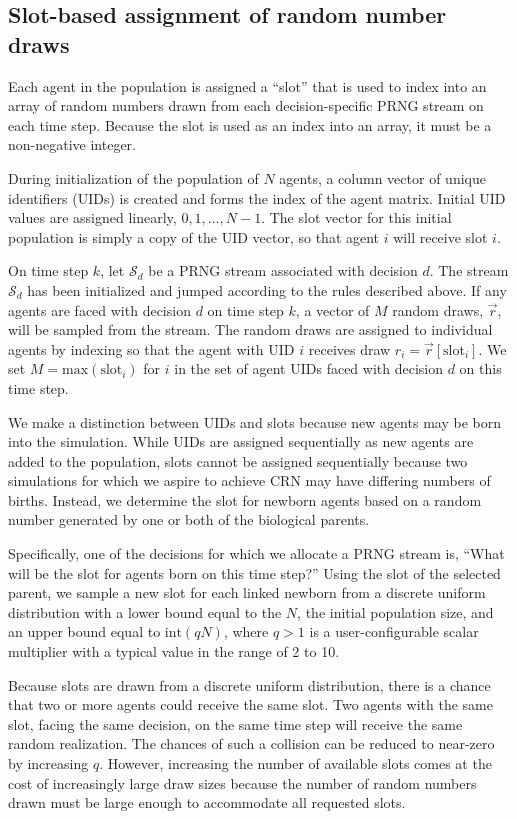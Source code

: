 \documentclass[10pt,letterpaper]{article}
\begin{document}
\subsection*{Slot-based assignment of random number draws}\label{s:slots}

Each agent in the population is assigned a ``slot'' that is used to index into an array of random numbers drawn from each decision-specific PRNG stream on each time step. Because the slot is used as an index into an array, it must be a non-negative integer.

During initialization of the population of $N$ agents, a column vector of unique identifiers (UIDs) is created and forms the index of the agent matrix. Initial UID values are assigned linearly, $0, 1, \ldots, N-1$. The slot vector for this initial population is simply a copy of the UID vector, so that agent $i$ will receive slot $i$.

On time step $k$, let $\mathcal{S}_d$ be a PRNG stream associated with decision $d$. The stream $\mathcal{S}_d$ has been initialized and jumped according to the rules described above. If any agents are faced with decision $d$ on time step $k$, a vector of $M$ random draws, $\vec{r}$, will be sampled from the stream. The random draws are assigned to individual agents by indexing so that the agent with UID $i$ receives draw $r_{i} = \vec{r}\left[\text{slot}_i\right]$. We set $M = \text{max}(\text{slot}_i)$ for $i$ in the set of agent UIDs faced with decision $d$ on this time step.

We make a distinction between UIDs and slots because new agents may be born into the simulation. While UIDs are assigned sequentially as new agents are added to the population, slots cannot be assigned sequentially because two simulations for which we aspire to achieve CRN may have differing numbers of births. Instead, we determine the slot for newborn agents based on a random number generated by one or both of the biological parents.

Specifically, one of the decisions for which we allocate a PRNG stream is, ``What will be the slot for agents born on this time step?'' Using the slot of the selected parent, we sample a new slot for each linked newborn from a discrete uniform distribution with a lower bound equal to the $N$, the initial population size, and an upper bound equal to $\text{int}(qN)$, where $q>1$ is a user-configurable scalar multiplier with a typical value in the range of 2 to 10.

Because slots are drawn from a discrete uniform distribution, there is a chance that two or more agents could receive the same slot. Two agents with the same slot, facing the same decision, on the same time step will receive the same random realization. The chances of such a collision can be reduced to near-zero by increasing $q$. However, increasing the number of available slots comes at the cost of increasingly large draw sizes because the number of random numbers drawn must be large enough to accommodate all requested slots.
\end{document}
